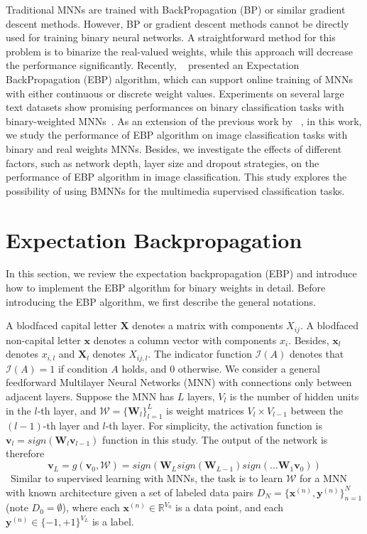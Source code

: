 \documentclass{article} %
\begin{document}
Traditional MNNs are trained with BackPropagation (BP) or similar gradient descent methods. However, BP or gradient descent methods cannot
be directly used for training binary neural networks.  A straightforward method for this problem is to binarize the real-valued weights, while this approach will decrease the performance significantly.
Recently, ~\citet{Soudry14} presented an Expectation BackPropagation (EBP) algorithm, which can support online training of MNNs with either continuous or discrete weight values. Experiments on several large text datasets show promising performances on binary classification tasks with binary-weighted MNNs~\citep{Soudry14}.  As an extension of the previous work by ~\citet{Soudry14},
in this work, we study the performance of EBP algorithm on image classification tasks with binary and real weights MNNs.
Besides, we investigate the effects of different factors,  such as network depth, layer size and dropout strategies,
on the performance of EBP algorithm in image classification. This study
explores the possibility of using BMNNs for the multimedia supervised classification tasks.


\section{Expectation Backpropagation}
In this section, we review the expectation backpropagation (EBP) and  introduce how to implement the EBP algorithm for binary weights in detail.
Before introducing the EBP algorithm, we first describe the general notations.

A blodfaced capital letter $\bm{X}$ denotes a matrix with components $X_{ij}$. A blodfaced non-capital letter $\textbf{x}$ denotes a column vector with components $x_i$. Besides, $\textbf{x}_l$ denotes $x_{i,l}$ and $\bm{X}_l$ denotes $X_{ij,l}$. The indicator function $\mathcal{I}(A)$ denotes that $\mathcal{I}(A)=1$ if condition $A$ holds, and 0 otherwise. We consider a general feedforward Multilayer Neural Networks (MNN) with connections only between adjacent layers. Suppose the MNN has $L$ layers, $V_l$ is the number of hidden units in the $l$-th layer, and $\mathcal{W} = \{\bm{W}_{l}\}^L_{l=1}$ is weight matrices $V_l \times V_{l-1}$ between the $(l-1)$-th layer and $l$-th layer. For simplicity, the activation function is $\bm{v}_l=sign(\bm{W}_l\bm{v}_{l-1})$ function in this study. The output of the network is therefore
\begin{equation} \label{eq:ebp-d}
    \textbf{v}_L = g(\textbf{v}_0, \mathcal{W})=sign(\bm{W}_Lsign(\bm{W}_{L-1})sign(...\bm{W}_1\textbf{v}_0))
\end{equation}\
Similar to supervised learning with MNNs, the task is to learn $\mathcal{W}$ for a MNN with known architecture given a set of labeled data pairs $D_N = \{\textbf{x}^{(n)}, \textbf{y}^{(n)}\}^N_{n=1}$ (note $D_0 = \emptyset$), where each $\textbf{x}^{(n)} \in \mathds{R}^{V_0}$ is a data point, and each $\textbf{y}^{(n)} \in \{-1,+1\}^{V_L}$ is a label.
\end{document}
